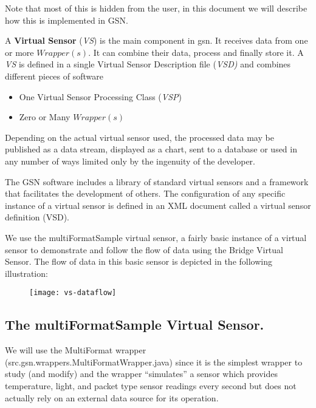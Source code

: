 Note that most of this is hidden from the user, in this document we
will describe how this is implemented in GSN.



A \textbf{Virtual Sensor} (\textit{VS}) is the main component in gsn.
It receives data from one or more \begin{math}Wrapper(s)\end{math}. It
can combine their data, process and finally store it. A \textit{VS} is
defined in a single  Virtual Sensor Description file (\textit{VSD)} and
combines different pieces of software

\begin{itemize}
	\item One Virtual Sensor Processing Class (\textit{VSP})
	\item Zero or Many \begin{math}Wrapper(s)\end{math}
\end{itemize}

Depending on the actual virtual sensor used, the processed data may be
published as a data stream, displayed as a chart, sent to a database or
used in any number of ways limited only by the ingenuity of the
developer.

The GSN software includes a library of standard virtual sensors and a
framework that facilitates the development of others.  The
configuration of any specific instance of a virtual sensor is defined
in an XML document called a virtual sensor definition (VSD).

We use the multiFormatSample virtual sensor, a fairly basic instance
of a virtual sensor to demonstrate and follow the flow of data using
the Bridge Virtual Sensor.  The flow of data in this basic sensor is
depicted in the following illustration:

\begin{figure}%
  \centering
  \texttt{[image: vs-dataflow]}
  \caption{}
  \label{fig:gsn-network-firewall}
\end{figure}

\subsection{The multiFormatSample Virtual Sensor.}

We will use the MultiFormat wrapper
(src.gsn.wrappers.MultiFormatWrapper.java) since it is the simplest
wrapper to study (and modify) and the wrapper
\textquotedblleft{}simulates\textquotedblright{} a sensor which
provides temperature, light, and packet type sensor readings every
second but does not actually rely on an external data source for its
operation.

